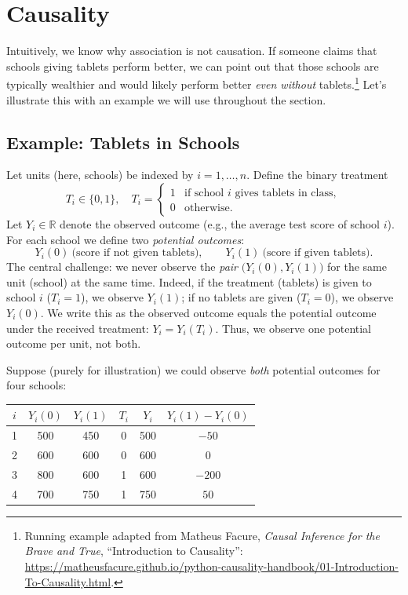 \documentclass[11pt]{exam}
\theoremstyle{plain}
\newcommand{\R}{\mathbb{R}}
\begin{document}

\begingroup\small

\section{Causality}

Intuitively, we know why association is not causation. If someone claims that schools giving tablets perform better, we can point out that those schools are typically wealthier and would likely perform better \emph{even without} tablets.\footnote{Running example adapted from Matheus Facure, \emph{Causal Inference for the Brave and True}, “Introduction to Causality”: \url{https://matheusfacure.github.io/python-causality-handbook/01-Introduction-To-Causality.html}.} Let's illustrate this with an example we will use throughout the section.

\subsection{Example: Tablets in Schools}
Let units (here, schools) be indexed by $i=1,\dots,n$. Define the binary treatment
\[
  T_i \in \{0,1\},\quad T_i =
  \begin{cases}
    1 & \text{if school $i$ gives tablets in class},\\
    0 & \text{otherwise.}
  \end{cases}
\]
Let $Y_i \in \R$ denote the observed outcome (e.g., the average test score of school $i$). For each school we define two \emph{potential outcomes}:
\[
  Y_i(0)\ \text{(score if not given tablets)},\qquad Y_i(1)\ \text{(score if given tablets)}.
\]
The central challenge: we never observe the \emph{pair} $\big(Y_i(0),Y_i(1)\big)$ for the same unit (school) at the same time. Indeed, if the treatment (tablets) is given to school $i$ ($T_i=1$), we observe $Y_i(1)$; if no tablets are given ($T_i=0$), we observe $Y_i(0)$. We write this as the observed outcome equals the potential outcome under the received treatment: $Y_i = Y_i(T_i)$. Thus, we observe one potential outcome per unit, not both.
\medskip

\noindent
Suppose (purely for illustration) we could observe \emph{both} potential outcomes for four schools:
\begin{center}
\begin{tabular}{@{}cccccc@{}}
\toprule
$i$ & $Y_i(0)$ & $Y_i(1)$ & $T_i$ & $Y_i$ & $Y_i(1)-Y_i(0)$\\
\midrule
1 & 500 & 450 & 0 & 500 & $-50$\\
2 & 600 & 600 & 0 & 600 & $0$\\
3 & 800 & 600 & 1 & 600 & $-200$\\
4 & 700 & 750 & 1 & 750 & $50$\\
\bottomrule
\end{tabular}
\end{center}
\end{document}
